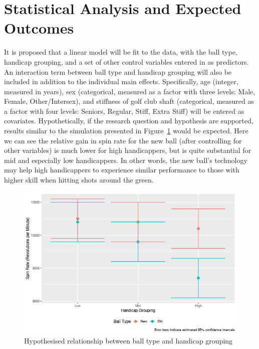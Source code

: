 \documentclass{article}
\begin{document}
\section{Statistical Analysis and Expected Outcomes}
It is proposed that a linear model will be fit to the data, with the ball type, handicap grouping, and a set of other control variables entered in as predictors. 
An interaction term between ball type and handicap grouping will also be included in addition to the individual main effects. 
Specifically, age (integer, measured in years), sex (categorical, measured as a factor with three levels: Male, Female, Other/Intersex), and stiffness of golf club shaft (categorical, measured as a factor with four levels: Seniors, Regular, Stiff, Extra Stiff) will be entered as covariates. 
Hypothetically, if the research question and hypothesis are supported, results similar to the simulation presented in Figure~\ref{fig:expectations} would be expected.
Here we can see the relative gain in spin rate for the new ball (after controlling for other variables) is much lower for high handicappers, but is quite substantial for mid and especially low handicappers. 
In other words, the new ball's technology may help high handicappers to experience similar performance to those with higher skill when hitting shots around the green. 

\begin{figure}[t!]
    \centering
    \includegraphics[max width=\linewidth]{expectations}
    \caption{\label{fig:expectations}Hypothesised relationship between ball type and handicap grouping}
\end{figure}
\end{document}

